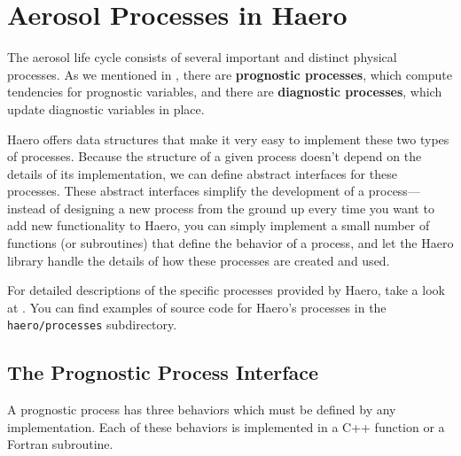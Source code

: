 \section{Aerosol Processes in Haero}

The aerosol life cycle consists of several important and distinct physical
processes. As we mentioned in , there are
{\bf prognostic processes}, which compute tendencies for prognostic variables,
and there are {\bf diagnostic processes}, which update diagnostic variables
in place.

Haero offers data structures that make it very easy to implement these two types
of processes. Because the structure of a given process doesn't depend on the
details of its implementation, we can define abstract interfaces for these
processes. These abstract interfaces simplify the development of a process---
instead of designing a new process from the ground up every time you want to
add new functionality to Haero, you can simply implement a small number of
functions (or subroutines) that define the behavior of a process, and let the
Haero library handle the details of how these processes are created and used.

For detailed descriptions of the specific processes provided by Haero, take a
look at . You can find examples of source code for
Haero's processes in the \texttt{haero/processes} subdirectory.

\subsection{The Prognostic Process Interface}

A prognostic process has three behaviors which must be defined by any
implementation. Each of these behaviors is implemented in a C++ function or
a Fortran subroutine.

